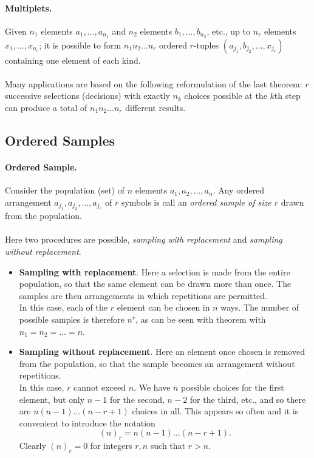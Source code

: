\documentclass{article}
\numberwithin{equation}{subsection}
\begin{document}
			\paragraph{Multiplets.} Given $n_1$ elements $a_1,\dots,a_{n_1}$ and $n_2$ elements $b_1,\dots,b_{n_2}$, etc., up to $n_r$ elements $x_1,\dots,x_{n_r}$; it is possible to form $n_1n_2\dots n_r$ ordered $r$-tuples $(a_{j_1}, b_{j_2}, \dots, x_{j_r})$ containing one element of each kind.
			\paragraph{} Many applications are based on the following reformulation of the last theorem: $r$ successive selections (decisions) with exactly $n_k$ choices possible at the $k$th step can produce a total of $n_1n_2\dots n_r$ different results.
		\subsection{Ordered Samples}
			\paragraph{Ordered Sample. } Consider the population (set) of $n$ elements $a_1, a_2,\dots, a_n$. Any ordered arrangement $a_{j_1}, a_{j_2}, \dots, a_{j_r}$ of $r$ symbols is call an \textit{ordered sample of size $r$} drawn from the population.
			\paragraph{} Here two procedures are possible, \textit{sampling with replacement} and \textit{sampling without replacement}.
			\begin{itemize}
			\item \textbf{Sampling with replacement}. Here a selection is made from the entire population, so that the same element can be drawn more than once. The samples are then arrangements in which repetitions are permitted. \\ In this case, each of the $r$ element can be chosen in $n$ ways. The number of possible samples is therefore $n^r$, as can be seen with theorem with $n_1 = n_2 = \dots = n$.
			\item \textbf{Sampling without replacement}. Here an element once chosen is removed from the population, so that the sample becomes an arrangement without repetitions. \\ In this case, $r$ cannot exceed $n$. We have $n$ possible choices for the first element, but only $n-1$ for the second, $n-2$ for the third, etc., and so there are $n(n-1)\dots (n-r+1)$ choices in all. This appears so often and it is convenient to introduce the notation 
			\begin{equation}
				(n)_r = n(n-1)\dots (n-r+1).
			\end{equation}
			Clearly $(n)_r = 0$ for integers $r, n$ such that $r > n$.
			\end{itemize}			
\end{document}
